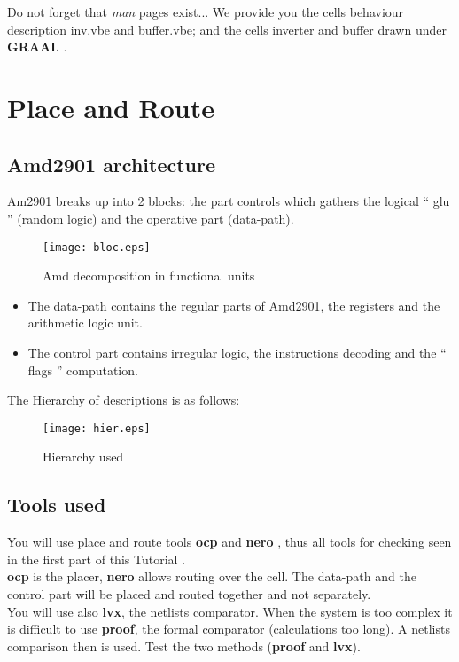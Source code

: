 \documentclass[12pt]{article}
\begin{document}
Do not forget that { \it man } pages exist...
We provide you the cells behaviour description inv.vbe and buffer.vbe;
and the cells inverter and buffer drawn under { \bf GRAAL }.


\section{Place and Route}

\subsection{Amd2901 architecture}

Am2901 breaks up into 2 blocks: the part controls which gathers
the logical `` glu '' (random logic) and the operative part (data-path).

\begin{figure}[H]\centering
  \texttt{[image: bloc.eps]}
  \caption{Amd decomposition in functional units}
  \label{Fig:decomposition}
\end{figure}


\begin{itemize}\itemsep=-.4ex
\item The data-path contains the regular parts of Amd2901, the registers
     and the arithmetic logic unit.
\item The control part contains irregular logic, 
    the instructions decoding and the `` flags '' computation.
\end{itemize}

The Hierarchy of descriptions is as follows:
\begin{figure}[H]\centering
  \texttt{[image: hier.eps]}
  \caption{Hierarchy used}
  \label{Fig:hierarchie}
\end{figure}

\subsection{Tools used}

You will use place and route tools { \bf ocp } and {\bf nero },
thus all tools for checking seen in the first part of this Tutorial .\\
{\bf ocp} is the placer, {\bf nero} allows routing over the cell.
The data-path and the control part will be placed and routed together and not separately. \\
You will use also {\bf lvx}, the netlists comparator. When the
system is too complex it is difficult to use {\bf proof}, the
formal comparator (calculations too long). A netlists comparison 
then is used. Test the two methods ({\bf proof} and {\bf
lvx}).
\end{document}

